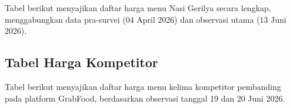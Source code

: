 Tabel berikut menyajikan daftar harga menu Nasi Gerilya secara lengkap, menggabungkan data pra-survei (04 April 2026) dan observasi utama (13 Juni 2026).



\subsection*{Tabel Harga Kompetitor}

Tabel berikut menyajikan daftar harga menu kelima kompetitor pembanding pada platform GrabFood, berdasarkan observasi tanggal 19 dan 20 Juni 2026.


